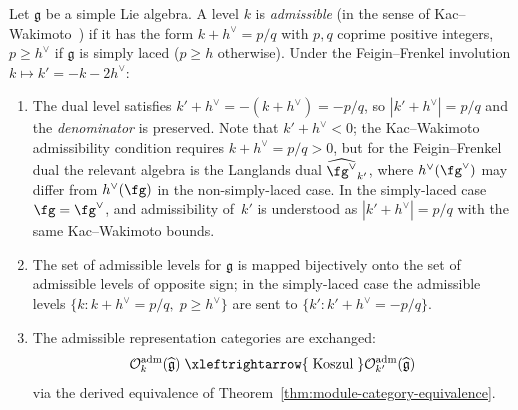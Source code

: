 \begin{proposition}
\label{prop:admissible-levels-permuted}
Let $\mathfrak{g}$ be a simple Lie algebra.  A level $k$ is \emph{admissible}
\textup{(}in the sense of Kac--Wakimoto~\cite{KW88}\textup{)} if it has the form
$k + h^\vee = p/q$ with $p,q$ coprime positive integers,
$p \geq h^\vee$ if $\mathfrak{g}$ is simply laced \textup{(}$p \geq h$ otherwise\textup{)}.
Under the Feigin--Frenkel involution $k \mapsto k' = -k - 2h^\vee$:
\begin{enumerate}[label=\textup{(\roman*)}]
\item The dual level satisfies $k' + h^\vee = -(k + h^\vee) = -p/q$,
so $|k' + h^\vee| = p/q$ and the \emph{denominator} is preserved.
Note that $k' + h^\vee < 0$; the Kac--Wakimoto admissibility condition
requires $k + h^\vee = p/q > 0$, but for the Feigin--Frenkel dual
the relevant algebra is the Langlands dual $\widehat{\fg^\vee}_{k'}$,
where $h^\vee(\fg^\vee)$ may differ from $h^\vee(\fg)$ in the
non-simply-laced case.  In the simply-laced case $\fg = \fg^\vee$,
and admissibility of~$k'$ is understood as $|k' + h^\vee| = p/q$ with
the same Kac--Wakimoto bounds.
\item The set of admissible levels for $\mathfrak{g}$ is mapped bijectively
onto the set of admissible levels of opposite sign; in the
simply-laced case the admissible levels $\{k : k + h^\vee = p/q,\;
p \geq h^\vee\}$ are sent to $\{k' : k' + h^\vee = -p/q\}$.
\item The admissible representation categories are exchanged:
\[
\mathcal{O}_k^{\mathrm{adm}}(\widehat{\mathfrak{g}})
\;\xleftrightarrow{\;\text{Koszul}\;}
\mathcal{O}_{k'}^{\mathrm{adm}}(\widehat{\mathfrak{g}})
\]
via the derived equivalence of
Theorem~\textup{\ref{thm:module-category-equivalence}}.
\end{enumerate}
\end{proposition}

